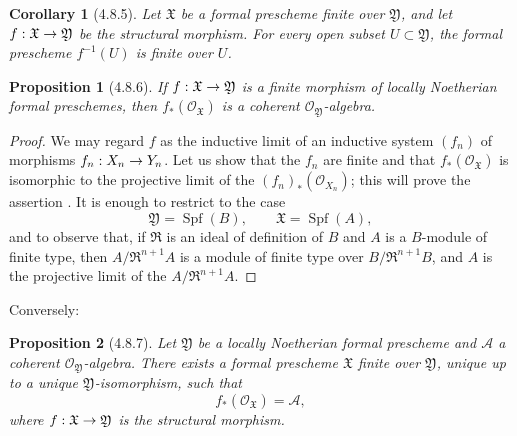 \documentclass[oneside]{amsart}
\theoremstyle{ega-env-style}
\theoremstyle{ega-thm-env-style}
\newtheorem*{proposition}{Proposition}
\newtheorem*{corollary}{Corollary}
\theoremstyle{ega-defn-env-style}
\def\mathcal{\mathscr}
\def\sh{\mathcal}                   %
\def\Spf{\operatorname{Spf}}
\renewcommand{\to}{\mathchoice{\longrightarrow}{\rightarrow}{\rightarrow}{\rightarrow}}
\let\EGAOriginalLabel\label
\renewcommand{\label}[1]{\phantomsection\EGAOriginalLabel{#1}}
\begin{document}
\begin{corollary}[4.8.5]
\label{III.4.8.5}
Let $\mathfrak{X}$ be a formal prescheme finite over
$\mathfrak{Y}$, and let
$f:\mathfrak{X}\to\mathfrak{Y}$ be the structural morphism.  For
every open subset $U\subset\mathfrak{Y}$, the formal prescheme
$f^{-1}(U)$ is finite over $U$.
\end{corollary}

\begin{proposition}[4.8.6]
\label{III.4.8.6}
If $f:\mathfrak{X}\to\mathfrak{Y}$ is a finite morphism of locally
Noetherian formal preschemes, then
$f_*(\sh{O}_{\mathfrak{X}})$ is a coherent
$\sh{O}_{\mathfrak{Y}}$-algebra.
\end{proposition}

\begin{proof}
We may regard $f$ as the inductive limit of an inductive system
$(f_n)$ of morphisms $f_n:X_n\to Y_n$.  Let us show that the
$f_n$ are finite and that $f_*(\sh{O}_{\mathfrak{X}})$ is
isomorphic to the projective limit of the
$(f_n)_*(\sh{O}_{X_n})$; this will prove the assertion
.  It is enough to restrict to the case
\[
  \mathfrak{Y}=\Spf(B),\qquad \mathfrak{X}=\Spf(A),
\]
and to observe that, if $\mathfrak{R}$ is an ideal of definition
of $B$ and $A$ is a $B$-module of finite type, then
$A/\mathfrak{R}^{n+1}A$ is a module of finite type over
$B/\mathfrak{R}^{n+1}B$, and $A$ is the projective limit of the
$A/\mathfrak{R}^{n+1}A$.
\end{proof}

Conversely:

\begin{proposition}[4.8.7]
\label{III.4.8.7}
Let $\mathfrak{Y}$ be a locally Noetherian formal prescheme and
$\sh{A}$ a coherent $\sh{O}_{\mathfrak{Y}}$-algebra.  There exists
a formal prescheme $\mathfrak{X}$ finite over $\mathfrak{Y}$,
unique up to a unique $\mathfrak{Y}$-isomorphism, such that
\[
  f_*(\sh{O}_{\mathfrak{X}})=\sh{A},
\]
where $f:\mathfrak{X}\to\mathfrak{Y}$ is the structural morphism.
\end{proposition}
\end{document}
